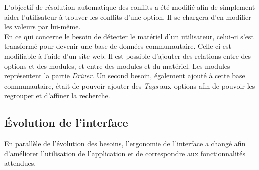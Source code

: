 ﻿\documentclass[17pts]{report}
\begin{document}
L'objectif de résolution automatique des conflits a été modifié afin de
simplement aider l'utilisateur à trouver les conflits d'une option. Il se
chargera d'en modifier les valeurs par lui-même.  \\

En ce qui concerne le besoin de détecter le matériel d'un utilisateur, celui-ci
s'est transformé pour devenir une base de données communautaire. Celle-ci est
modifiable à l'aide d'un site web. Il est possible d'ajouter des relations
entre des options et des modules, et entre des modules et du matériel. Les
modules représentent la partie \textit{Driver}. Un second besoin, également
ajouté à cette base communautaire, était de pouvoir ajouter des \textit{Tags}
aux options afin de pouvoir les regrouper et d'affiner la recherche.

\subsection{Évolution de l'interface}
\label{sub:Évolution de l'interface}
En parallèle de l'évolution des besoins, l'ergonomie de l'interface a changé
afin d'améliorer l'utilisation de l'application et de correspondre aux
fonctionnalités attendues.
\end{document}
